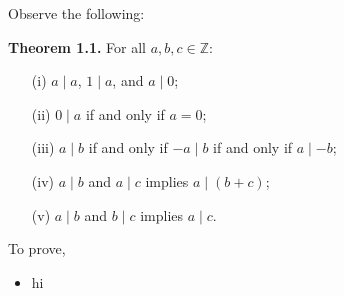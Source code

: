 \newpage

\noindent
Observe the following:
\begin{theo}

    \textbf{Theorem 1.1.} For all $a, b, c \in \mathbb{Z}$:

    \begin{itemize}
        \item[(i)] $a \mid a$, $1 \mid a$, and $a \mid 0$;
        \item[(ii)] $0 \mid a$ if and only if $a = 0$;
        \item[(iii)] $a \mid b$ if and only if $-a \mid b$ if and only if $a \mid -b$;
        \item[(iv)] $a \mid b$ and $a \mid c$ implies $a \mid (b + c)$;
        \item[(v)] $a \mid b$ and $b \mid c$ implies $a \mid c$.
    \end{itemize}
\end{theo}

To prove,

\begin{Proof}[Theorem 1.1]
    \begin{itemize}
        \item hi
    \end{itemize}
\end{Proof}